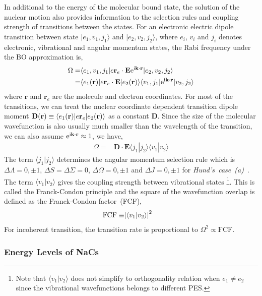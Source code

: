 In additional to the energy of the molecular bound state,
the solution of the nuclear motion also provides information to the selection rules
and coupling strength of transitions between the states.
For an electronic electric dipole transition between state
$|e_1,v_1,j_1\rangle$ and $|e_2,v_2,j_2\rangle$,
where $e_i$, $v_i$ and $j_i$ denotes electronic, vibrational and angular momentum states,
the Rabi frequency under the BO approximation is,
\begin{align*}
  \Omega=&\langle e_1,v_1,j_1|e\mathbf{r}_e\cdot\mathbf{E}\mathrm{e}^{\mathrm{i}\mathbf{k}\cdot\mathbf{r}}|e_2,v_2,j_2\rangle\\
  =&\langle e_1(\mathbf{r})|e\mathbf{r}_e\cdot\mathbf{E}|e_2(\mathbf{r})\rangle\langle v_1,j_1|\mathrm{e}^{\mathrm{i}\mathbf{k}\cdot\mathbf{r}}|v_2,j_2\rangle
\end{align*}
where $\mathbf{r}$ and $\mathbf{r}_e$ are the molecule and electron coordinates.
For most of the transitions, we can treat the nuclear coordinate dependent transition dipole
moment $\mathbf{D}{\left({\mathbf{r}}\right)}\equiv\langle e_1(\mathbf{r})|e\mathbf{r}_e|e_2(\mathbf{r})\rangle$ as a constant $\mathbf{D}$.
Since the size of the molecular wavefunction is also usually much smaller than
the wavelength of the transition, we can also assume $\mathrm{e}^{\mathrm{i}\mathbf{k}\cdot\mathbf{r}}\approx 1$,
we have,
\begin{align*}
  \Omega=&\mathbf{D}\cdot\mathbf{E}\langle j_1|j_2\rangle\langle v_1|v_2\rangle
\end{align*}
The term $\langle j_1|j_2\rangle$ determines the angular momentum selection rule which is
$\Delta\Lambda=0,\pm1$, $\Delta S=\Delta\Sigma=0$, $\Delta\Omega=0,\pm1$ and $\Delta J=0,\pm1$
for \textit{Hund's~case~(a)}~\cite[p.~14-15]{straughan_spectroscopy_1976}.
The term $\langle v_1|v_2\rangle$ gives the coupling strength between vibrational states
\footnote{Note that $\langle v_1|v_2\rangle$ does not simplify to orthogonality relation
  when $e_1\neq e_2$ since the vibrational wavefunctions belongs to different PES.}.
This is called the Franck-Condon principle and the square of the wavefunction overlap
is defined as the Franck-Condon factor~(FCF),
\begin{align*}
  \mathrm{FCF}\equiv&{\left|{\langle v_1|v_2\rangle}\right|}^2
\end{align*}
For incoherent transition, the transition rate is proportional to $\Omega^2\propto\mathrm{FCF}$.

\subsubsection{Energy Levels of NaCs}

